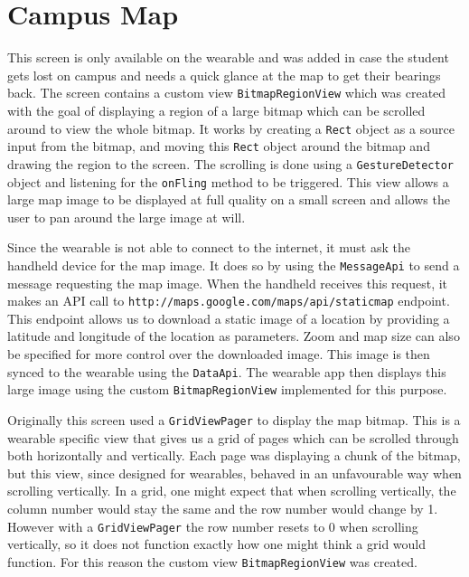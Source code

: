
\clearpage
\section{Campus Map}

This screen is only available on the wearable and was added in case the student
gets lost on campus and needs a quick glance at the map to get their bearings
back. The screen contains a custom view \texttt{BitmapRegionView} which was
created with the goal of displaying a region of a large bitmap which can be
scrolled around to view the whole bitmap. It works by creating a \texttt{Rect}
object as a source input from the bitmap, and moving this \texttt{Rect} object
around the bitmap and drawing the region to the screen. The scrolling is done
using a \texttt{GestureDetector} object and listening for the \texttt{onFling}
method to be triggered. This view allows a large map image to be displayed at
full quality on a small screen and allows the user to pan around the large image
at will.

Since the wearable is not able to connect to the internet, it must ask the
handheld device for the map image. It does so by using the \texttt{MessageApi}
to send a message requesting the map image. When the handheld receives this
request, it makes an API call to
\texttt{http://maps.google.com/maps/api/staticmap} endpoint. This endpoint
allows us to download a static image of a location by providing a latitude and
longitude of the location as parameters. Zoom and map size can also be
specified for more control over the downloaded image. This image is then synced
to the wearable using the \texttt{DataApi}. The wearable app then displays this
large image using the custom \texttt{BitmapRegionView} implemented for this
purpose.

Originally this screen used a \texttt{GridViewPager} to display the map bitmap.
This is a wearable specific view that gives us a grid of pages which can be
scrolled through both horizontally and vertically. Each page was displaying
a chunk of the bitmap, but this view, since designed for wearables, behaved
in an unfavourable way when scrolling vertically. In a grid, one might expect
that when scrolling vertically, the column number would stay the same and the
row number would change by 1. However with a \texttt{GridViewPager} the row
number resets to 0 when scrolling vertically, so it does not function exactly
how one might think a grid would function. For this reason the custom view
\texttt{BitmapRegionView} was created.

